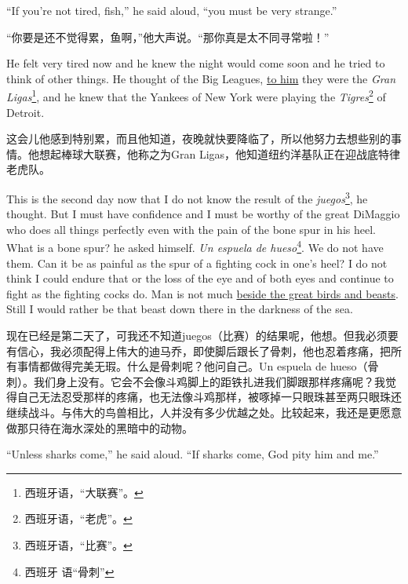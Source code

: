 \begin{paracol}{2}
\switchcolumn*

``If you're not tired, fish,'' he said aloud, ``you must be very strange.''

\switchcolumn

“你要是还不觉得累，鱼啊，”他大声说。“那你真是太不同寻常啦！”

\switchcolumn*

He felt very tired now and he knew the night would come soon and he tried to
think of other things. He thought of the Big Leagues, \uline{to him} they were the
\emph{Gran Ligas}\footnote{西班牙语，“大联赛”。}, and he knew that the
Yankees of New York were playing the \emph{Tigres}\footnote{西班牙语，“老虎”。} of Detroit.

\switchcolumn

这会儿他感到特别累，而且他知道，夜晚就快要降临了，所以他努力去想些别的事情。他想起棒球大联赛，他称之为Gran Ligas，他知道纽约洋基队正在迎战底特律老虎队。

\switchcolumn*

This is the second day now that I do not know the result of the
\emph{juegos}\footnote{西班牙语，“比赛”。}, he thought. But I must have
confidence and I must be worthy of the great DiMaggio who does all things
perfectly even with the pain of the bone \gls{spur} in his \gls{heel}. What
is a bone spur? he asked himself. \emph{Un espuela de hueso}\footnote{西班牙
  语“骨刺”}. We do not have them. Can it be as painful as the spur of a
fighting cock in one's heel? I do not think I could endure that or the loss
of the eye and of both eyes and continue to fight as the fighting cocks do.
Man is not much \uline{\gls{beside} the great birds and \glspl{beast}}.
Still I would rather be that beast down there in the darkness of the sea.

\switchcolumn

现在已经是第二天了，可我还不知道juegos（比赛）的结果呢，他想。但我必须要有信心，我必须配得上伟大的迪马乔，即使脚后跟长了骨刺，他也忍着疼痛，把所有事情都做得完美无瑕。什么是骨刺呢？他问自己。Un espuela de hueso（骨刺）。我们身上没有。它会不会像斗鸡脚上的距铁扎进我们脚跟那样疼痛呢？我觉得自己无法忍受那样的疼痛，也无法像斗鸡那样，被啄掉一只眼珠甚至两只眼珠还继续战斗。与伟大的鸟兽相比，人并没有多少优越之处。比较起来，我还是更愿意做那只待在海水深处的黑暗中的动物。

\switchcolumn*

``Unless sharks come,'' he said aloud. ``If sharks come, God pity him and me.''

\switchcolumn


\end{paracol}
